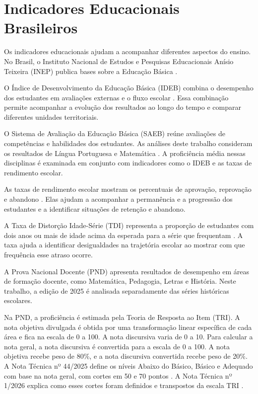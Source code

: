 \section{Indicadores Educacionais Brasileiros}

Os indicadores educacionais ajudam a acompanhar diferentes aspectos do ensino. No Brasil, o Instituto Nacional de Estudos e Pesquisas Educacionais Anísio Teixeira (INEP) publica bases sobre a Educação Básica \cite{inep2024ideb}.

O Índice de Desenvolvimento da Educação Básica (IDEB) combina o desempenho dos estudantes em avaliações externas e o fluxo escolar \cite[p.~1--2]{inep2007notatecnicaideb}. Essa combinação permite acompanhar a evolução dos resultados ao longo do tempo e comparar diferentes unidades territoriais.

O Sistema de Avaliação da Educação Básica (SAEB) reúne avaliações de competências e habilidades dos estudantes. As análises deste trabalho consideram os resultados de Língua Portuguesa e Matemática \cite{inep2025saeb,inep2020saebmatrizes}. A proficiência média nessas disciplinas é examinada em conjunto com indicadores como o IDEB e as taxas de rendimento escolar.

As taxas de rendimento escolar mostram os percentuais de aprovação, reprovação e abandono \cite[p.~19]{inep2004dicionario}. Elas ajudam a acompanhar a permanência e a progressão dos estudantes e a identificar situações de retenção e abandono.

A Taxa de Distorção Idade-Série (TDI) representa a proporção de estudantes com dois anos ou mais de idade acima da esperada para a série que frequentam \cite[p.~17]{inep2004dicionario}. A taxa ajuda a identificar desigualdades na trajetória escolar ao mostrar com que frequência esse atraso ocorre.

A Prova Nacional Docente (PND) apresenta resultados de desempenho em áreas de formação docente, como Matemática, Pedagogia, Letras e História. Neste trabalho, a edição de 2025 é analisada separadamente das séries históricas escolares.

Na PND, a proficiência é estimada pela Teoria de Resposta ao Item (TRI). A nota objetiva divulgada é obtida por uma transformação linear específica de cada área e fica na escala de 0 a 100. A nota discursiva varia de 0 a 10. Para calcular a nota geral, a nota discursiva é convertida para a escala de 0 a 100. A nota objetiva recebe peso de 80\%, e a nota discursiva convertida recebe peso de 20\%. A Nota Técnica nº 44/2025 define os níveis Abaixo do Básico, Básico e Adequado com base na nota geral, com cortes em 50 e 70 pontos \cite[p.~5--6, itens 7--9]{inep2025notatecnica44}. A Nota Técnica nº 1/2026 explica como esses cortes foram definidos e transpostos da escala TRI \cite[p.~6--9, itens 7--8]{inep2026notatecnica1}.


